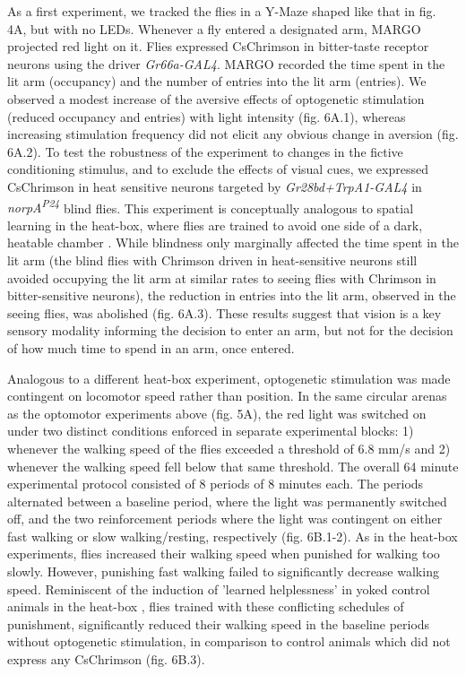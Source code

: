 \documentclass[10pt]{article}
\begin{document}
\begin{multicols}{2}
As a first experiment, we tracked the flies in a Y-Maze shaped like that in fig. 4A, but with no LEDs. Whenever a fly entered a designated arm, MARGO projected red light on it. Flies expressed CsChrimson in bitter-taste receptor neurons using the driver \textit{Gr66a-GAL4}. MARGO recorded the time spent in the lit arm (occupancy) and the number of entries into the lit arm (entries). We observed a modest increase of the aversive effects of optogenetic stimulation (reduced occupancy and entries) with light intensity (fig. 6A.1), whereas increasing stimulation frequency did not elicit any obvious change in aversion (fig. 6A.2). To test the robustness of the experiment to changes in the fictive conditioning stimulus, and to exclude the effects of visual cues, we expressed CsChrimson in heat sensitive neurons targeted by \textit{Gr28bd+TrpA1-GAL4} in \textit{norpA\textsuperscript{P24}} blind flies. This experiment is conceptually analogous to spatial learning in the heat-box, where flies are trained to avoid one side of a dark, heatable chamber \cite{wustmann_rein_wolf_heisenberg_1996,wustmann_heisenberg_1997,diegelmann_2006,ostrowski_kahsai_kramer_knutson_zars_2015,putz_2002,sitaraman_zars_zars_2007,sitaraman_zars_zars_2010,zars_zars_2006}. While blindness only marginally affected the time spent in the lit arm (the blind flies with Chrimson driven in heat-sensitive neurons still avoided occupying the lit arm at similar rates to seeing flies with Chrimson in bitter-sensitive neurons), the reduction in entries into the lit arm, observed in the seeing flies, was abolished (fig. 6A.3). These results suggest that vision is a key sensory modality informing the decision to enter an arm, but not for the decision of how much time to spend in an arm, once entered.

Analogous to a different heat-box experiment\cite{YANG2013799}, optogenetic stimulation was made contingent on locomotor speed rather than position. In the same circular arenas as the optomotor experiments above (fig. 5A), the red light was switched on under two distinct conditions enforced in separate experimental blocks: 1) whenever the walking speed of the flies exceeded a threshold of 6.8 mm/s and 2) whenever the walking speed fell below that same threshold. The overall 64 minute experimental protocol consisted of 8 periods of 8 minutes each. The periods alternated between a baseline period, where the light was permanently switched off, and the two reinforcement periods where the light was contingent on either fast walking or slow walking/resting, respectively (fig. 6B.1-2). As in the heat-box experiments, flies increased their walking speed when punished for walking too slowly. However, punishing fast walking failed to significantly decrease walking speed. Reminiscent of the induction of 'learned helplessness' in yoked control animals in the heat-box \cite{YANG2013799}, flies trained with these conflicting schedules of punishment, significantly reduced their walking speed in the baseline periods without optogenetic stimulation, in comparison to control animals which did not express any CsChrimson (fig. 6B.3).


\end{multicols}
\end{document}
